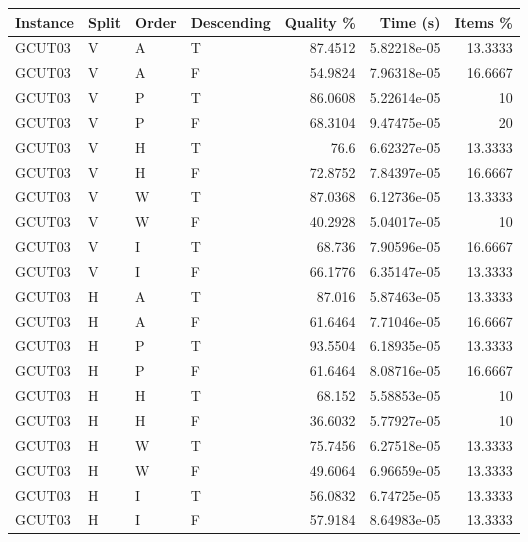 \begin{tabular}{llllrrr}
    \hline
    Instance & Split & Order & Descending & Quality \% & Time (s)    & Items \% \\
    \hline
    GCUT03   & V     & A     & T          & 87.4512    & 5.82218e-05 & 13.3333  \\
    GCUT03   & V     & A     & F          & 54.9824    & 7.96318e-05 & 16.6667  \\
    GCUT03   & V     & P     & T          & 86.0608    & 5.22614e-05 & 10       \\
    GCUT03   & V     & P     & F          & 68.3104    & 9.47475e-05 & 20       \\
    GCUT03   & V     & H     & T          & 76.6       & 6.62327e-05 & 13.3333  \\
    GCUT03   & V     & H     & F          & 72.8752    & 7.84397e-05 & 16.6667  \\
    GCUT03   & V     & W     & T          & 87.0368    & 6.12736e-05 & 13.3333  \\
    GCUT03   & V     & W     & F          & 40.2928    & 5.04017e-05 & 10       \\
    GCUT03   & V     & I     & T          & 68.736     & 7.90596e-05 & 16.6667  \\
    GCUT03   & V     & I     & F          & 66.1776    & 6.35147e-05 & 13.3333  \\
    GCUT03   & H     & A     & T          & 87.016     & 5.87463e-05 & 13.3333  \\
    GCUT03   & H     & A     & F          & 61.6464    & 7.71046e-05 & 16.6667  \\
    GCUT03   & H     & P     & T          & 93.5504    & 6.18935e-05 & 13.3333  \\
    GCUT03   & H     & P     & F          & 61.6464    & 8.08716e-05 & 16.6667  \\
    GCUT03   & H     & H     & T          & 68.152     & 5.58853e-05 & 10       \\
    GCUT03   & H     & H     & F          & 36.6032    & 5.77927e-05 & 10       \\
    GCUT03   & H     & W     & T          & 75.7456    & 6.27518e-05 & 13.3333  \\
    GCUT03   & H     & W     & F          & 49.6064    & 6.96659e-05 & 13.3333  \\
    GCUT03   & H     & I     & T          & 56.0832    & 6.74725e-05 & 13.3333  \\
    GCUT03   & H     & I     & F          & 57.9184    & 8.64983e-05 & 13.3333  \\

\end{tabular}
